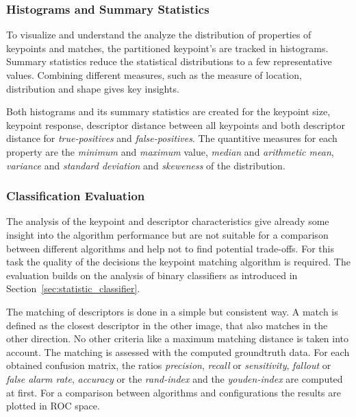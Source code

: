 \subsubsection{Histograms and Summary Statistics}

To visualize and understand the analyze the distribution of properties of keypoints and matches, the partitioned keypoint's are tracked in histograms.
Summary statistics reduce the statistical distributions to a few representative values.
Combining different measures, such as the measure of location, distribution and shape gives key insights.

Both histograms and its summary statistics are created for the keypoint size, keypoint response, descriptor distance between all keypoints and both descriptor distance for \emph{true-positives} and \emph{false-positives}.
The quantitive measures for each property are the \emph{minimum} and \emph{maximum} value, \emph{median} and \emph{arithmetic mean}, \emph{variance} and \emph{standard deviation} and \emph{skeweness} of the distribution.

\subsubsection{Classification Evaluation}

The analysis of the keypoint and descriptor characteristics give already some insight into the algorithm performance but are not suitable for a comparison between different algorithms and help not to find potential trade-offs.
For this task the quality of the decisions the keypoint matching algorithm is required.
The evaluation builds on the analysis of binary classifiers as introduced in Section~\ref{sec:statistic_classifier}.

The matching of descriptors is done in a simple but consistent way.
A match is defined as the closest descriptor in the other image, that also matches in the other direction.
No other criteria like a maximum matching distance is taken into account.
The matching is assessed with the computed groundtruth data.
For each obtained confusion matrix, the ratios \emph{precision}, \emph{recall} or \emph{sensitivity}, \emph{fallout} or \emph{false alarm rate}, \emph{accuracy} or the \emph{rand-index} and the \emph{youden-index} are computed at first.
For a comparison between algorithms and configurations the results are plotted in \gls{ROC} space.
